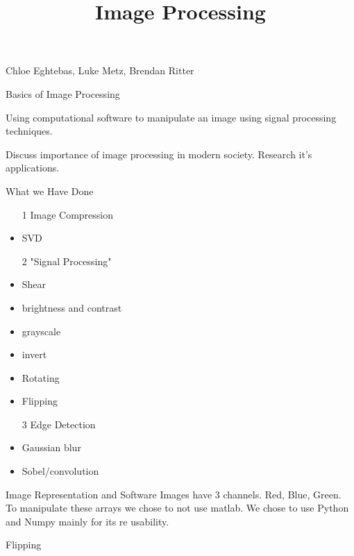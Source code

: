 \documentclass{beamer}
\begin{document}
\begin{frame}{}

\title{\textbf{Image Processing}}
\maketitle

Chloe Eghtebas, Luke Metz, Brendan Ritter

\end{frame}


\begin{frame}{Basics of Image Processing}


Using computational software to manipulate an image using signal processing techniques.

Discuss importance of image processing in modern society. Research it's applications. 

\end{frame}


\begin{frame}{What we Have Done}


\begin{itemize}
	\item[1]Image Compression
	\item SVD
	\item[2]"Signal Processing" 
	\item Shear
    \item brightness and contrast 
    \item grayscale
    \item invert
    \item Rotating
    	\item Flipping
    \item[3]Edge Detection 
    \item Gaussian blur
    \item Sobel/convolution

\end{itemize}
\end{frame}

\begin{frame}{Image Representation and Software}
Images have 3 channels. Red, Blue, Green. To manipulate these arrays we chose to not use matlab. We chose to use Python and Numpy mainly for its re usability.
\end{frame} 


\begin{frame}{Flipping}

\end{frame}
\end{document}
